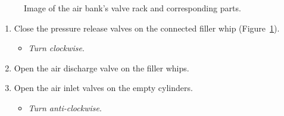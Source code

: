 \documentclass[
  letterpaper,
  DIV=11,
  numbers=noendperiod]{scrreprt}
\providecommand{\tightlist}{%
  \setlength{\itemsep}{0pt}\setlength{\parskip}{0pt}}\usepackage{longtable,booktabs,array}
\begin{document}
\begin{figure}[H]

\begin{minipage}[t]{0.33\linewidth}

{\centering 


}

\end{minipage}%
%
\begin{minipage}[t]{0.33\linewidth}

{\centering 


}

\end{minipage}%
%
\begin{minipage}[t]{0.33\linewidth}

{\centering 


}

\end{minipage}%

\caption{\label{fig-bankrack}Image of the air bank's valve rack and
corresponding parts.}

\end{figure}

\begin{enumerate}
\def\labelenumi{\arabic{enumi}.}
\setcounter{enumi}{3}
\tightlist
\item
  Close the pressure release valves on the connected filler whip
  (Figure~\ref{fig-bankrack}).

  \begin{itemize}
  \tightlist
  \item
    \emph{Turn clockwise}.
  \end{itemize}
\item
  Open the air discharge valve on the filler whips.
\item
  Open the air inlet valves on the empty cylinders.

  \begin{itemize}
  \tightlist
  \item
    \emph{Turn anti-clockwise}.
  \end{itemize}
\end{enumerate}
\end{document}
